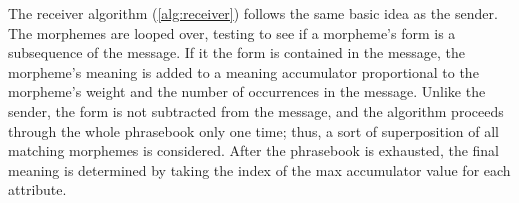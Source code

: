 The receiver algorithm (\cref{alg:receiver}) follows the same basic idea as the sender.
The morphemes are looped over, testing to see if a morpheme's form is a subsequence of the message.
If it the form is contained in the message, the morpheme's meaning is added to a meaning accumulator proportional to the morpheme's weight and the number of occurrences in the message.
Unlike the sender, the form is not subtracted from the message, and the algorithm proceeds through the whole phrasebook only one time;
  thus, a sort of superposition of all matching morphemes is considered.
After the phrasebook is exhausted, the final meaning is determined by taking the index of the max accumulator value for each attribute.
